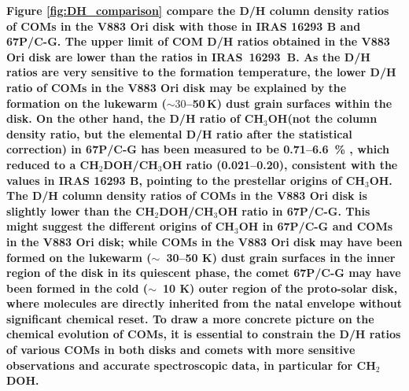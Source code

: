 \documentclass[linenumbers, twocolumn, twocolappendix, astrosymb, times]{aastex631}
\newcommand{\methanol}{CH$_3$OH\xspace}
\newcommand{\acetaldehyde}{CH$_3$CHO\xspace}
\newcommand{\methylformate}{CH$_3$OCHO\xspace}
\begin{document}
\textbf{Figure \ref{fig:DH_comparison} compare the D/H column density ratios of COMs in the V883 Ori disk with those in IRAS 16293 B and 67P/C-G. The upper limit of COM D/H ratios obtained in the V883 Ori disk are lower than the ratios in IRAS~16293~B. 
As the D/H ratios are very sensitive to the formation temperature, the lower D/H ratio of COMs in the V883 Ori disk may be explained by the formation on the lukewarm ($\sim30$--50\,K) dust grain surfaces within the disk. On the other hand, the D/H ratio of \methanol (not the column density ratio, but the elemental D/H ratio after the statistical correction) in 67P/C-G has been measured to be 0.71--6.6~\% \citep{Drozdovskaya2021}, which reduced to a CH$_2$DOH/CH$_3$OH ratio (0.021--0.20), consistent with the values in IRAS 16293 B, pointing to the prestellar origins of \methanol \citep{Drozdovskaya2021}. The D/H column density ratios of COMs in the V883 Ori disk is slightly lower than the CH$_2$DOH/CH$_3$OH ratio in 67P/C-G. This might suggest the different origins of \methanol in 67P/C-G and COMs in the V883 Ori disk; while COMs in the V883 Ori disk may have been formed on the lukewarm ($\sim$~30--50 K) dust grain surfaces in the inner region of the disk in its quiescent phase, the comet 67P/C-G may have been formed in the cold ($\sim$~10 K) outer region of the proto-solar disk, where molecules are directly inherited from the natal envelope without significant chemical reset. To draw a more concrete picture on the chemical evolution of COMs, it is essential to constrain the D/H ratios of various COMs in both disks and comets with more sensitive observations and accurate spectroscopic data, in particular for CH$_2$DOH.}
\end{document}
